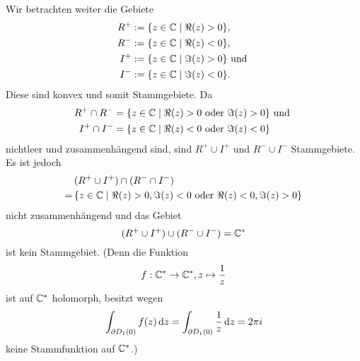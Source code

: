 \documentclass[a4paper,10pt]{article}
\begin{document}
Wir betrachten weiter die Gebiete
\begin{align*}
 R^+ &:= \{z \in \mathbb{C} \mid \Re(z) > 0\}, \\
 R^- &:= \{z \in \mathbb{C} \mid \Re(z) < 0\}, \\
 I^+ &:= \{z \in \mathbb{C} \mid \Im(z) > 0\} \text{ und } \\
 I^- &:= \{z \in \mathbb{C} \mid \Im(z) < 0\}.
\end{align*}
Diese sind konvex und somit Stammgebiete. Da
\begin{align*}
 R^+ \cap R^- &= \{z \in \mathbb{C} \mid \Re(z) > 0 \text{ oder } \Im(z) > 0\} \text{ und } \\
 I^+ \cap I^- &= \{z \in \mathbb{C} \mid \Re(z) < 0 \text{ oder } \Im(z) < 0\}
\end{align*}
nichtleer und zusammenhängend sind, sind $R^+ \cup I^+$ und $R^- \cup I^-$ Stammgebiete. Es ist jedoch
\begin{align*}
  &\, (R^+ \cup I^+) \cap (R^- \cap I^-) \\
 =&\,  \{z \in \mathbb{C} \mid \Re(z) > 0, \Im(z) < 0 \text{ oder } \Re(z) < 0, \Im(z) > 0\}
\end{align*}
nicht zusammenhängend und das Gebiet
\[
 (R^+ \cup I^+) \cup (R^- \cup I^-) = \mathbb{C}^*
\]
ist kein Stammgebiet. (Denn die Funktion
\[
 f : \mathbb{C}^* \to \mathbb{C}^*, z \mapsto \frac{1}{z}
\]
ist auf $\mathbb{C}^*$ holomorph, besitzt wegen
\[
 \int_{\partial D_1(0)} f(z) \,\text{d}z
 = \int_{\partial D_1(0)} \frac{1}{z} \,\text{d}z
 = 2 \pi i
\]
keine Stammfunktion auf $\mathbb{C}^*$.)





\section{}
\end{document}
